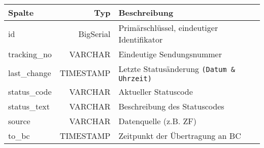 \label{bcTracking}
\begin{tabular}{lrl} %
    \hline
    \rowcolor{heading}\textbf{Spalte} & \textbf{Typ} & \textbf{Beschreibung} \\
    \hline
    id & BigSerial & Primärschlüssel, eindeutiger Identifikator \\
    \rowcolor{odd}tracking\_no & VARCHAR & Eindeutige Sendungsnummer \\
    last\_change & TIMESTAMP & Letzte Statusänderung \texttt{(Datum \& Uhrzeit)} \\
    \rowcolor{odd}status\_code & VARCHAR & Aktueller Statuscode \\
    status\_text & VARCHAR & Beschreibung des Statuscodes \\
    \rowcolor{odd}source & VARCHAR & Datenquelle (z.B. ZF) \\
    to\_bc & TIMESTAMP & Zeitpunkt der Übertragung an BC \\
    \hline
\end{tabular}
    
